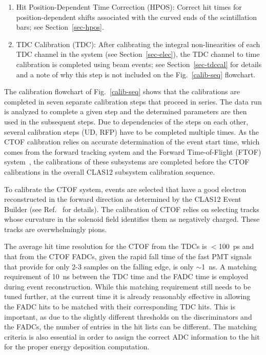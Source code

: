 \documentclass[3p,times,twocolumn]{elsarticle}
\begin{document}
\begin{enumerate}
\item Hit Position-Dependent Time Correction (HPOS): Correct hit times for position-dependent shifts
associated with the curved ends of the scintillation bars; see Section~\ref{sec-hpos}.

\item TDC Calibration (TDC): After calibrating the integral non-linearities of each TDC channel in the system
(see Section~\ref{sec-elec}), the TDC channel to time calibration is completed using beam events; see
Section~\ref{sec-tdccal} for details and a note of why this step is not included on the Fig.~\ref{calib-seq}
flowchart.

\end{enumerate}

The calibration flowchart of Fig.~\ref{calib-seq} shows that the calibrations are completed in seven separate
calibration steps that proceed in series. The data run is analyzed to complete a given step and the determined
parameters are then used in the subsequent steps. Due to dependencies of the steps on each other, several
calibration steps (UD, RFP) have to be completed multiple times. As the CTOF calibration relies on accurate
determination of the event start time, which comes from the forward tracking system and the Forward
Time-of-Flight (FTOF) system~\cite{ftof-nim}, the calibrations of these subsystems are completed before
the CTOF calibrations in the overall CLAS12 subsystem calibration sequence.

To calibrate the CTOF system, events are selected that have a good electron reconstructed in the forward
direction as determined by the CLAS12 Event Builder (see Ref.~\cite{recon-nim} for details). The calibration
of CTOF relies on selecting tracks whose curvature in the solenoid field identifies them as negatively charged.
These tracks are overwhelmingly pions.

The average hit time resolution for the CTOF from the TDCs is $<$100~ps and that from the CTOF
FADCs, given the rapid fall time of the fast PMT signals that provide for only 2-3 samples on the falling
edge, is only $\sim$1~ns. A matching requirement of 10~ns between the TDC time and the FADC time is
employed during event reconstruction. While this matching requirement still needs to be tuned further,
at the current time it is already reasonably effective in allowing the FADC hits to be matched with their
corresponding TDC hits. This is important, as due to the slightly different thresholds on the discriminators
and the FADCs, the number of entries in the hit lists can be different. The matching criteria is also essential
in order to assign the correct ADC information to the hit for the proper energy deposition computation.
\end{document}
